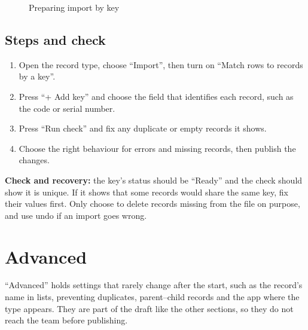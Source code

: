 \begin{figure}[H]
\centering
{}
\rclegend
\caption{Preparing import by key}
\label{fig:builder-import-flow}
\end{figure}

\subsection{Steps and check}
\begin{enumerate}
\item Open the record type, choose “Import”, then turn on “Match rows to records by a key”.
\item Press “+ Add key” and choose the field that identifies each record, such as the code or serial number.
\item Press “Run check” and fix any duplicate or empty records it shows.
\item Choose the right behaviour for errors and missing records, then publish the changes.
\end{enumerate}

\textbf{Check and recovery:} the key's status should be “Ready” and the check should show it is unique. If it shows that some records would share the same key, fix their values first. Only choose to delete records missing from the file on purpose, and use undo if an import goes wrong.

\clearpage
\section{Advanced}
\label{sec:builder-feature-advanced}

“Advanced” holds settings that rarely change after the start, such as the record's name in lists, preventing duplicates, parent–child records and the app where the type appears. They are part of the draft like the other sections, so they do not reach the team before publishing.

